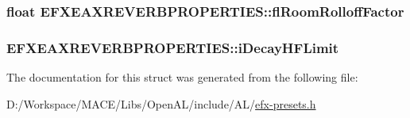 \subsubsection[{\texorpdfstring{fl\+Room\+Rolloff\+Factor}{flRoomRolloffFactor}}]{\setlength{\rightskip}{0pt plus 5cm}float E\+F\+X\+E\+A\+X\+R\+E\+V\+E\+R\+B\+P\+R\+O\+P\+E\+R\+T\+I\+E\+S\+::fl\+Room\+Rolloff\+Factor}\hypertarget{struct_e_f_x_e_a_x_r_e_v_e_r_b_p_r_o_p_e_r_t_i_e_s_addd42aea886c8930594cf15f91fb8bec}{}\label{struct_e_f_x_e_a_x_r_e_v_e_r_b_p_r_o_p_e_r_t_i_e_s_addd42aea886c8930594cf15f91fb8bec}
\subsubsection[{\texorpdfstring{i\+Decay\+H\+F\+Limit}{iDecayHFLimit}}]{ E\+F\+X\+E\+A\+X\+R\+E\+V\+E\+R\+B\+P\+R\+O\+P\+E\+R\+T\+I\+E\+S\+::i\+Decay\+H\+F\+Limit}\hypertarget{struct_e_f_x_e_a_x_r_e_v_e_r_b_p_r_o_p_e_r_t_i_e_s_a454d6bbeaeaf108414712439d36679ff}{}\label{struct_e_f_x_e_a_x_r_e_v_e_r_b_p_r_o_p_e_r_t_i_e_s_a454d6bbeaeaf108414712439d36679ff}


The documentation for this struct was generated from the following file\+:\begin{DoxyCompactItemize}
\item 
D\+:/\+Workspace/\+M\+A\+C\+E/\+Libs/\+Open\+A\+L/include/\+A\+L/\hyperlink{efx-presets_8h}{efx-\/presets.\+h}\end{DoxyCompactItemize}
